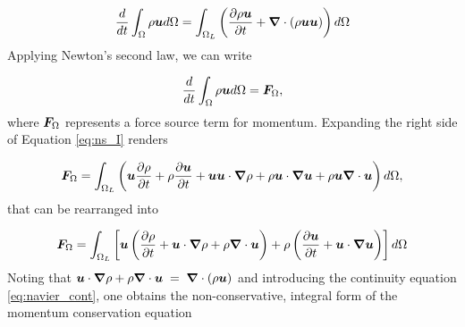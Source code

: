 %
	\begin{equation} \label{eq:ns_I}
		\frac{d}{dt}\int_\Omega \rho \boldsymbol{u} d\Omega = \int_{\Omega_L} \left( \frac{\partial \rho \boldsymbol{u}}{\partial t} + \boldsymbol{\nabla}  \cdot(\rho \boldsymbol{u} \boldsymbol{u}) \right) d\Omega
	\end{equation}
%
%
%
Applying Newton's second law, we can write

%
	\begin{equation} \label{eq:ns_II}
		\frac{d}{dt}\int_\Omega \rho \boldsymbol{u} d\Omega = \boldsymbol{F}_\Omega,
	\end{equation}
%
where $\boldsymbol{F}_\Omega$ represents a force source term for momentum. Expanding the right side of Equation \eqref{eq:ns_I} renders

%
	\begin{equation} \label{eq:ns_IV}
		\boldsymbol{F}_\Omega = \int_{\Omega_L} \left(\boldsymbol{u}\frac{\partial \rho}{\partial t} + \rho\frac{\partial \boldsymbol{u}}{\partial t} + \boldsymbol{u} \boldsymbol{u} \cdot \boldsymbol{\nabla} \rho + \rho \boldsymbol{u} \cdot \boldsymbol{\nabla}  \boldsymbol{u}    + \rho \boldsymbol{u} \boldsymbol{\nabla}  \cdot \boldsymbol{u} \right) d\Omega,
	\end{equation}
%
that can be rearranged into

%
	\begin{equation} \label{eq:ns_V}
		\boldsymbol{F}_\Omega = \int_{\Omega_L} \left[ \boldsymbol{u}\left( \frac{\partial \rho}{\partial t} + \boldsymbol{u} \cdot \boldsymbol{\nabla} \rho +\rho \boldsymbol{\nabla}  \cdot \boldsymbol{u} \right) + \rho\left( \frac{\partial \boldsymbol{u}}{\partial t} + \boldsymbol{u}  \cdot \boldsymbol{\nabla} \boldsymbol{u} \right) \right] d\Omega
	\end{equation}
%
Noting that $\boldsymbol{u} \cdot \boldsymbol{\nabla} \rho +\rho \boldsymbol{\nabla}  \cdot \boldsymbol{u}\;=\;\boldsymbol{\nabla}  \cdot (\rho\boldsymbol{u})$ and introducing the continuity equation \eqref{eq:navier_cont}, one obtains the non-conservative, integral form of the momentum conservation equation

